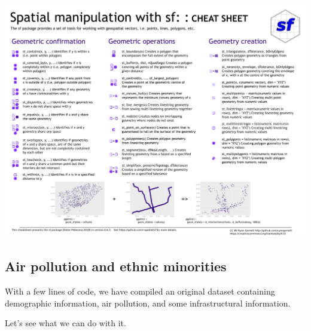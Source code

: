 \documentclass[
  letterpaper,
]{scrbook}
\begin{document}
\includegraphics{fig/sf_1.png}

\hypertarget{air-pollution-and-ethnic-minorities}{%
\subsection{Air pollution and ethnic
minorities}\label{air-pollution-and-ethnic-minorities}}

With a few lines of code, we have compiled an original dataset
containing demographic information, air pollution, and some
infrastructural information.

Let's see what we can do with it.
\end{document}
